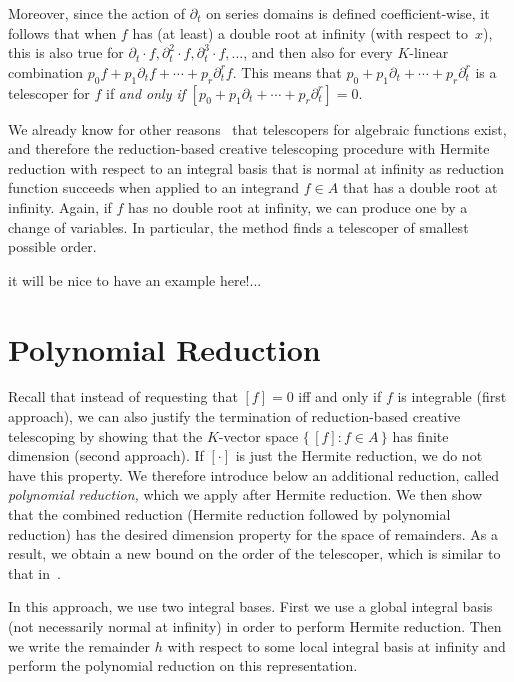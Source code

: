 \documentclass{sig-alternate}
\newcommand{\red}{\color{red}}
\begin{document}
Moreover, since the action of $\partial_t$ on series domains is defined coefficient-wise,
it follows that when $f$ has (at least) a double root at infinity (with respect to~$x$),
this is also true for $\partial_t\cdot f, \partial_t^2\cdot f, \partial_t^3\cdot f,\dots$,
and then also for every $K$-linear combination $p_0f+p_1\partial_tf+\cdots+p_r\partial_t^rf$.
This means that $p_0+p_1\partial_t+\cdots+p_r\partial_t^r$ is a telescoper for $f$ if
\emph{and only if} $[p_0+p_1\partial_t+\cdots+p_r\partial_t^r]=0$.

We already know for other reasons~\cite{Zeilberger1990,chyzak00,chen12d} that
telescopers for algebraic functions exist, and therefore the reduction-based
creative telescoping procedure with Hermite reduction with respect to an
integral basis that is normal at infinity as reduction function succeeds when
applied to an integrand $f\in A$ that has a double root at infinity. Again, if
$f$ has no double root at infinity, we can produce one by a change of variables.
In particular, the method finds a telescoper of smallest possible order.

{\red it will be nice to have an example here!...}


\section{Polynomial Reduction}\label{sec:polynomial}

Recall that instead of requesting that $[f]=0$ iff and only if $f$ is integrable
(first approach), we can also justify the termination of reduction-based
creative telescoping by showing that the $K$-vector space $\{\,[f]:f\in A\,\}$
has finite dimension (second approach). If $[\cdot]$ is just the Hermite
reduction, we do not have this property. We therefore introduce below an
additional reduction, called \emph{polynomial reduction,} which we apply after
Hermite reduction. We then show that the combined reduction (Hermite reduction
followed by polynomial reduction) has the desired dimension property for the
space of remainders. As a result, we obtain a new bound on the order of the
telescoper, which is similar to that in~\cite{chen14a}.

In this approach, we use two integral bases. First we use a global integral basis (not
necessarily normal at infinity) in order to perform Hermite reduction. Then we write the
remainder $h$ with respect to some local integral basis at infinity and perform the
polynomial reduction on this representation.
\end{document}
